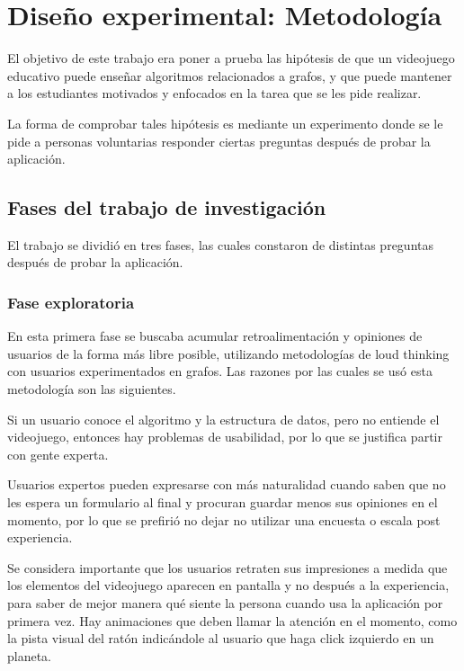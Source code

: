 \chapter{Diseño experimental: Metodología}

El objetivo de este trabajo era poner a prueba las hipótesis de que un videojuego educativo puede enseñar algoritmos relacionados a grafos, y que puede mantener a los estudiantes motivados y enfocados en la tarea que se les pide realizar. 

La forma de comprobar tales hipótesis es mediante un experimento donde se le pide a personas voluntarias responder ciertas preguntas después de probar la aplicación.

\section{Fases del trabajo de investigación}

El trabajo se dividió en tres fases, las cuales constaron de distintas preguntas después de probar la aplicación.

\subsection{Fase exploratoria}

En esta primera fase se buscaba acumular retroalimentación y opiniones de usuarios de la forma más libre posible, utilizando metodologías de loud thinking con usuarios experimentados en grafos. Las razones por las cuales se usó esta metodología son las siguientes.

Si un usuario conoce el algoritmo y la estructura de datos, pero no entiende el videojuego, entonces hay problemas de usabilidad, por lo que se justifica partir con gente experta.

Usuarios expertos pueden expresarse con más naturalidad cuando saben que no les espera un formulario al final y procuran guardar menos sus opiniones en el momento, por lo que se prefirió no dejar no utilizar una encuesta o escala post experiencia.

Se considera importante que los usuarios retraten sus impresiones a medida que los elementos del videojuego aparecen en pantalla y no después a la experiencia, para saber de mejor manera qué siente la persona cuando usa la aplicación por primera vez. Hay animaciones que deben llamar la atención en el momento, como la pista visual del ratón indicándole al usuario que haga click izquierdo en un planeta.

